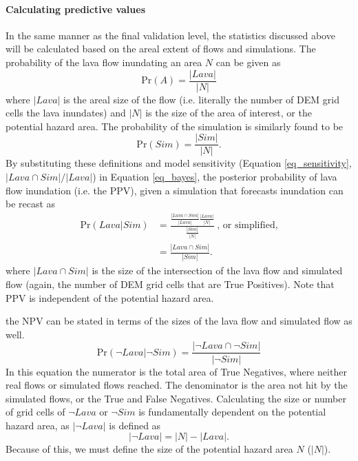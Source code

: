 		\paragraph{Calculating predictive values} In the same manner as the final validation level, the statistics discussed above will be calculated based on the areal extent of flows and simulations. The probability of the lava flow inundating an area $N$ can be given as
		\begin{equation}
			\text{Pr}(A)=\frac{|Lava|}{|N|}\label{eq_PA}
		\end{equation}
		where $|Lava|$ is the areal size of the flow (i.e. literally the number of DEM grid cells the lava inundates) and $|N|$ is the size of the area of interest, or the potential hazard area. The probability of the simulation is similarly found to be
		\begin{equation}
			\text{Pr}(Sim)=\frac{|Sim|}{|N|}.\label{eq_PB}
		\end{equation}
		By substituting these definitions and model sensitivity (Equation \ref{eq_sensitivity}, $|Lava \cap Sim|/|Lava|$) in Equation \ref{eq_bayes}, the posterior probability of lava flow inundation (i.e. the PPV), given a simulation that forecasts inundation can be recast as
		\begin{align}
		\text{Pr}(Lava|Sim)&=\frac{\frac{|Lava\cap Sim|}{|Lava|}\frac{|Lava|}{|N|}}{\frac{|Sim|}{|N|}}~\text{,~or~simplified,}\label{eq_unsimplepost}\\
		&=\frac{|Lava\cap Sim|}{|Sim|}.\label{eq_simplepost}
		\end{align}
		where $|Lava\cap Sim|$ is the size of the intersection of the lava flow and simulated flow (again, the number of DEM grid cells that are True Positives). Note that PPV is independent of the potential hazard area.
		
		the NPV can be stated in terms of the sizes of the lava flow and simulated flow as well.
		\begin{equation}
			\text{Pr}(\neg Lava|\neg Sim)=\frac{|\neg Lava\cap \neg Sim|}{|\neg Sim|}\label{eq_simplenegpost}
		\end{equation}
		In this equation the numerator is the total area of True Negatives, where neither real flows or simulated flows reached. The denominator is the area not hit by the simulated flows, or the True and False Negatives. Calculating the size or number of grid cells of $\neg Lava$ or $\neg Sim$ is fundamentally dependent on the potential hazard area, as $|\neg Lava|$ is defined as
		\begin{equation}
			|\neg Lava| = |N| - |Lava|.
		\end{equation}
		Because of this, we must define the size of the potential hazard area $N$ ($|N|$).	
	

